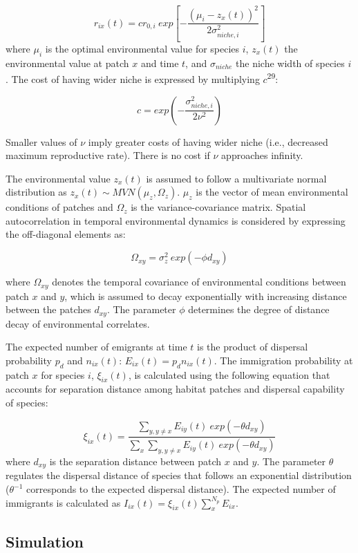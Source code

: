 \documentclass[
]{article}
\begin{document}
\[
r_{ix}(t) = cr_{0,i}~exp[{-\frac{(\mu_i-z_x(t))^2}{2\sigma^2_{niche,i}}}]
\] where \(\mu_i\) is the optimal environmental value for species \(i\),
\(z_x(t)\) the environmental value at patch \(x\) and time \(t\), and
\(\sigma_{niche}\) the niche width of species \(i\). The cost of having
wider niche is expressed by multiplying \(c\)\textsuperscript{29}:

\[
c = exp(-\frac{\sigma_{niche,i}^2}{2\nu^2})
\]

Smaller values of \(\nu\) imply greater costs of having wider niche
(i.e., decreased maximum reproductive rate). There is no cost if \(\nu\)
approaches infinity.

The environmental value \(z_x(t)\) is assumed to follow a multivariate
normal distribution as \(z_{x}(t) \sim MVN(\mu_z, \Omega_z)\). \(\mu_z\)
is the vector of mean environmental conditions of patches and
\(\Omega_z\) is the variance-covariance matrix. Spatial autocorrelation
in temporal environmental dynamics is considered by expressing the
off-diagonal elements as:

\[
\Omega_{xy} = \sigma_z^2~exp(-\phi d_{xy})
\]

where \(\Omega_{xy}\) denotes the temporal covariance of environmental
conditions between patch \(x\) and \(y\), which is assumed to decay
exponentially with increasing distance between the patches \(d_{xy}\).
The parameter \(\phi\) determines the degree of distance decay of
environmental correlates.

The expected number of emigrants at time \(t\) is the product of
dispersal probability \(p_d\) and \(n_{ix}(t)\):
\(E_{ix}(t) = p_{d}n_{ix}(t)\). The immigration probability at patch
\(x\) for species \(i\), \(\xi_{ix}(t)\), is calculated using the
following equation that accounts for separation distance among habitat
patches and dispersal capability of species:

\[
\xi_{ix}(t) = \frac{\sum_{y,y \neq x}E_{iy}(t)~exp(-\theta d_{xy})}{\sum_{x} \sum_{y,y \neq x}E_{iy}(t)~exp(-\theta d_{xy})}
\] where \(d_{xy}\) is the separation distance between patch \(x\) and
\(y\). The parameter \(\theta\) regulates the dispersal distance of
species that follows an exponential distribution (\(\theta^{-1}\)
corresponds to the expected dispersal distance). The expected number of
immigrants is calculated as
\(I_{ix}(t) = \xi_{ix}(t)\sum_x^{N_p} E_{ix}\).

\hypertarget{simulation}{%
\subsection{Simulation}\label{simulation}}
\end{document}
